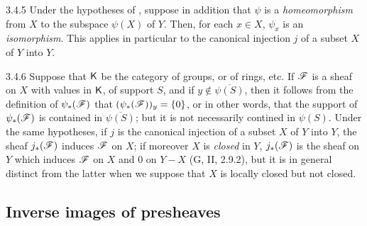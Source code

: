 \begin{env}{3.4.5}
\label{env-0.3.4.5}
Under the hypotheses of , suppose in addition that $\psi$ is a
\emph{homeomorphism} from $X$ to the subspace $\psi(X)$ of $Y$. Then, for each
$x\in X$, $\psi_x$ is an \emph{isomorphism}. This applies in particular to the
canonical injection $j$ of a subset $X$ of $Y$ into $Y$.
\end{env}

\begin{env}{3.4.6}
\label{env-0.3.4.6}
Suppose that $\mathsf{K}$ be the category of groups, or of rings, etc. If $\mathscr{F}$ is a
sheaf on $X$ with values in $\mathsf{K}$, of support $S$, and if
$y\not\in\overline{\psi(S)}$, then it follows from the definition of
$\psi_*(\mathscr{F})$ that $(\psi_*(\mathscr{F}))_y=\{0\}$, or in other words, that the
support of $\psi_*(\mathscr{F})$ is contained in $\overline{\psi(S)}$; but it is not
necessarily contined in $\psi(S)$. Under the same hypotheses, if $j$ is the
canonical injection of a subset $X$ of $Y$ into $Y$, the sheaf $j_*(\mathscr{F})$
induces $\mathscr{F}$ on $X$; if moreover $X$ is \emph{closed} in $Y$, $j_*(\mathscr{F})$
is the sheaf on $Y$ which induces $\mathscr{F}$ on $X$ and $0$ on $Y-X$
(G, II, 2.9.2), but it is in general distinct from the latter when we suppose
that $X$ is locally closed but not closed.
\end{env}

\subsection{Inverse images of presheaves}
\label{0-prelim-3.5}


